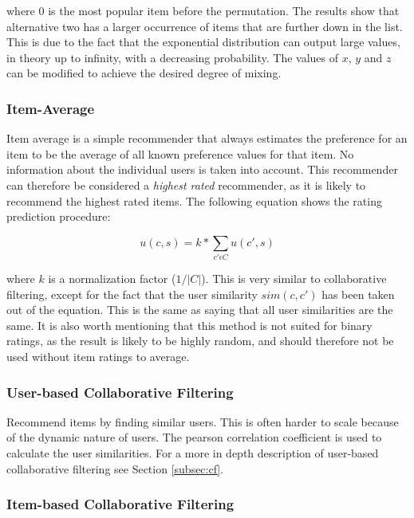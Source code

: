 where 0 is the most popular item before the permutation. The results show that alternative two has a larger occurrence of items that are further down in the list. This is due to the fact that the exponential distribution can output large values, in theory up to infinity, with a decreasing probability. The values of $x$, $y$ and $z$ can be modified to achieve the desired degree of mixing.

\subsubsection{Item-Average}

Item average is a simple recommender that always estimates the preference for an item to be the average of all known preference values for that item. No information about the individual users is taken into account. This recommender can therefore be considered a \emph{highest rated} recommender, as it is likely to recommend the highest rated items. The following equation shows the rating prediction procedure:

\begin{equation}
\label{equation:itemaverageratingprediction}
u(c,s) = k * \sum_{c' \epsilon C} u(c',s)
\end{equation}

where $k$ is a normalization factor ($1/|C|$). This is very similar to collaborative filtering, except for the fact that the user similarity $sim(c, c')$ has been taken out of the equation. This is the same as saying that all user similarities are the same. It is also worth mentioning that this method is not suited for binary ratings, as the result is likely to be highly random, and should therefore not be used without item ratings to average.

\subsubsection{User-based Collaborative Filtering}

Recommend items by finding similar users. This is often harder to scale because of the dynamic nature of users. The pearson correlation coefficient is used to calculate the user similarities. For a more in depth description of user-based collaborative filtering see Section \ref{subsec:cf}.

\subsubsection{Item-based Collaborative Filtering}

